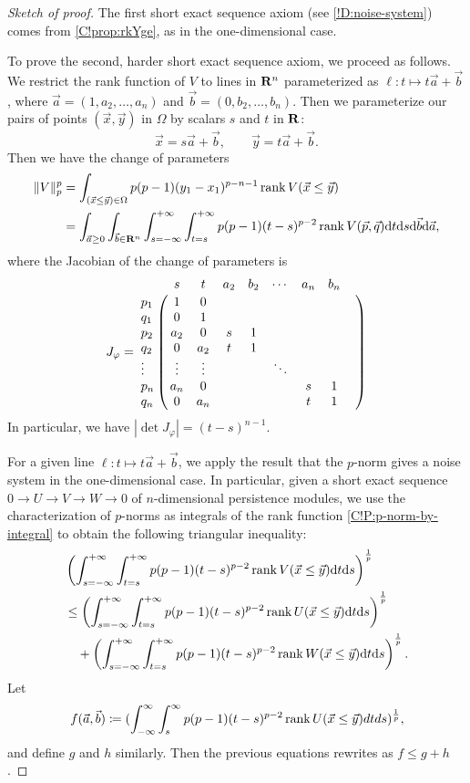 \begin{proof}[Sketch of proof]
  The first short exact sequence axiom (see \cref{!D:noise-system}) comes from \cref{C!prop:rkYge}, as in the one-dimensional case.

  To prove the second, harder short exact sequence axiom, we proceed as follows. We restrict the rank function of $V$ to lines in $\mathbf{R}^n$ parameterized as $\ell \colon t \mapsto t \vec{a} + \vec{b}$, where $\vec{a} = (1, a_2, \ldots, a_n)$ and $\vec{b} = (0, b_2, \ldots, b_n)$. Then we parameterize our pairs of points $(\vec{x}, \vec{y})$ in $\Omega$ by scalars $s$ and $t$ in $\mathbf{R}$:
  \[
    \vec{x} = s \vec{a} + \vec{b}, \qquad \vec{y} = t \vec{a} + \vec{b}.
  \]
  Then we have the change of parameters
  \begin{equation}
  \label{Eq:reparam}
    \begin{aligned}
      \| V \|_p^p & = \int_{(\vec{x} \leq \vec{y}) \in \Omega} p (p - 1) (y_1 - x_1)^{p - n - 1} \operatorname{rank} V(\vec{x} \leq \vec{y}) \\
      & = \int_{\vec{a} \geq 0} \int_{\vec{b} \in \mathbf{R}^n} \int_{s = -\infty}^{+\infty} \int_{t = s}^{+\infty} p (p - 1) (t - s)^{p - 2} \operatorname{rank} V(\vec{p}, \vec{q}) \text{d}t \text{d}s \text{d}\vec{b} \text{d}\vec{a},
    \end{aligned}
  \end{equation}
  where the Jacobian of the change of parameters is
  \[
    J_\varphi = \bordermatrix{%
      & s & t & a_2 & b_2 & \cdots & a_n & b_n & \cr
      p_1 & 1 & 0 \cr
      q_1 & 0 & 1 \cr
      p_2 & a_2 & 0 & s & 1 \cr
      q_2 & 0 & a_2 & t & 1 \cr
      \vdots & \vdots & \vdots &&& \ddots \cr
      p_n & a_n & 0 &&&& s & 1 \cr
      q_n & 0 & a_n &&&& t & 1
    }
  \]
  In particular, we have $|\det J_\varphi| = (t - s)^{n - 1}$.

  For a given line $\ell \colon t \mapsto t \vec{a} + \vec{b}$, we apply the result that the $p$-norm gives a noise system in the one-dimensional case. In particular, given a short exact sequence $0 \to U \to V \to W \to 0$ of $n$-dimensional persistence modules, we use the characterization of $p$-norms as integrals of the rank function \cref{C!P:p-norm-by-integral} to obtain the following triangular inequality:
  \begin{align*}
    & \left(\int_{s = -\infty}^{+\infty} \int_{t = s}^{+\infty} p (p - 1) (t - s)^{p - 2} \operatorname{rank} V(\vec{x} \leq \vec{y}) \text{d}t \text{d}s\right)^{\frac{1}{p}} \\
    & \leq \left(\int_{s = -\infty}^{+\infty} \int_{t = s}^{+\infty} p (p - 1) (t - s)^{p - 2} \operatorname{rank} U(\vec{x} \leq \vec{y}) \text{d}t \text{d}s\right)^{\frac{1}{p}} \\
    & \hspace{1em} + \left(\int_{s = -\infty}^{+\infty} \int_{t = s}^{+\infty} p (p - 1) (t - s)^{p - 2} \operatorname{rank} W(\vec{x} \leq \vec{y}) \text{d}t \text{d}s\right)^{\frac{1}{p}}.
  \end{align*}
  Let
  \[
    f(\vec{a},\vec{b}) \coloneq (\int_{-\infty}^\infty \int_s^\infty p (p - 1) (t-s)^{p - 2} \operatorname{rank} U(\vec{x} \leq \vec{y}) dt ds)^{\frac 1p},
  \]
  and define $g$ and $h$ similarly. Then the previous equations rewrites as $f \leq g + h$.


\end{proof}
